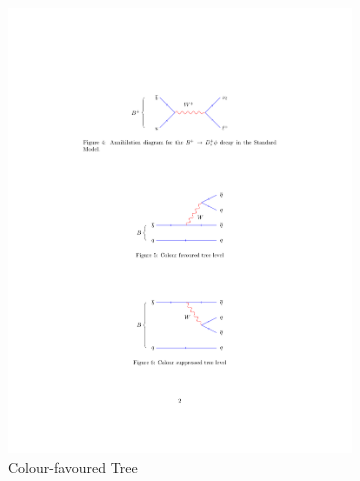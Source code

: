 \begin{figure}[!h]
    \centering
    \begin{subfigure}[b]{0.32\textwidth}
        \centering
        \includegraphics[width=1.0\textwidth]{figs/Theory/TreeFav.pdf}
        \caption{Colour-favoured Tree}
    \end{subfigure}
    \begin{subfigure}[b]{0.32\textwidth}
        \centering

\end{subfigure}
\end{figure}
